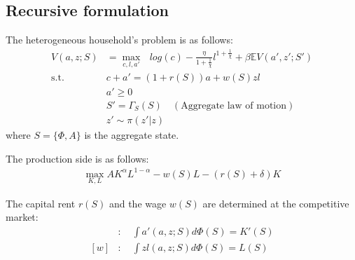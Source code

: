 \subsection*{Recursive formulation}
The heterogeneous household's problem is as follows:
\begin{align*}
  V(a,z;S) &= \max_{c,l,a'}\text{ } log(c) - \frac{\eta}{1+\frac{1}{\chi}}l^{1+\frac{1}{\chi}}+ \beta \mathbb{E}V(a',z';S')
  \\
  \text{s.t.}\quad& c + a' = (1+r(S))a + w(S)zl
  \\
  & a'\geq 0
  \\
  & S' = \Gamma_{S}(S) \quad(\text{Aggregate law of motion})
  \\
  & z' \sim \pi(z'|z)
\end{align*}
where $S = \{\Phi,A\}$ is the aggregate state.

The production side is as follows:
\begin{align*}
  \max_{K,L} A K^{\alpha}L^{1-\alpha} - w(S)L - (r(S)+\delta)K
\end{align*}

The capital rent $r(S)$ and the wage $w(S)$ are determined at the competitive market:
\begin{align*}
  [r]&:\quad \int a'(a,z;S)d\Phi(S) = K'(S)
  \\
  [w]&:\quad \int z l(a,z;S) d\Phi(S) = L(S)
\end{align*}
